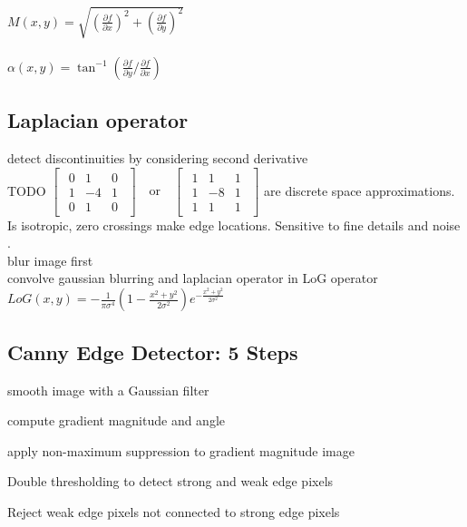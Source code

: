 \\
$M(x, y) = \sqrt{(\frac{\partial f}{\partial x})^{2} + (\frac{\partial f}{\partial y})^{2}}$\\
 \\
$\alpha(x, y) = \tan^{-1}(\frac{\partial f}{\partial y} / \frac{\partial f}{\partial x})$
\subsection*{Laplacian operator}
detect discontinuities by considering second derivative\\ TODO
$\begin{bmatrix}
    \begin{smallmatrix}
        0 & 1 & 0\\
        1 & -4 & 1\\
        0 & 1 & 0
    \end{smallmatrix}
\end{bmatrix}
\quad \text{or} \quad
\begin{bmatrix}
    \begin{smallmatrix}
        1 & 1 & 1\\
        1 & -8 & 1\\
        1 & 1 & 1
    \end{smallmatrix}
\end{bmatrix}$
are discrete space approximations. Is isotropic, zero crossings make edge locations. Sensitive to fine details and noise .\\ blur image first \\
 convolve gaussian blurring and laplacian operator in LoG operator  $LoG(x, y) = -\frac{1}{\pi \sigma^{4}} (1 - \frac{x^{2} + y^{2}}{2\sigma^{2}}) e^{-\frac{x^{2} + y^{2}}{2\sigma^{2}}}$
\subsection*{Canny Edge Detector: 5 Steps}
\begin{compactenum}
    \item smooth image with a Gaussian filter
    \item compute gradient magnitude and angle
    \item apply non-maximum suppression to gradient magnitude image 
    \item Double thresholding to detect strong and weak edge pixels
    \item Reject weak edge pixels not connected to strong edge pixels
\end{compactenum}
